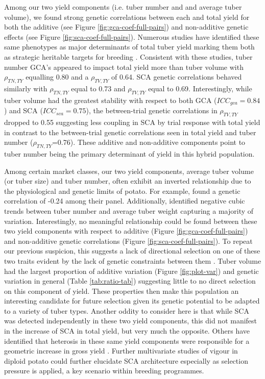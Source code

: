 Among our two yield components (i.e. tuber number and and average tuber volume), we found strong genetic correlations between each and total yield for both the additive (see Figure \ref{fig:gca-coef-full-pairs}) and non-additive genetic effects (see Figure \ref{fig:sca-coef-full-pairs}). Numerous studies have identified these same phenotypes as major determinants of total tuber yield marking them both as strategic heritable targets for breeding \parencite{Khayatnezhad2011, Thompson1984}. Consistent with these studies, tuber number GCA's appeared to impact total yield more than tuber volume with \(\rho_{TN,TY}\) equalling 0.80 and a \(\rho_{TV,TY}\) of 0.64. SCA genetic correlations behaved similarly with \(\rho_{TN,TY}\) equal to 0.73 and \(\rho_{TV,TY}\) equal to 0.69. Interestingly, while tuber volume had the greatest stability with respect to both GCA (\(ICC_{gca}=0.84\)) and SCA (\(ICC_{sca}=0.75\)), the between-trial genetic correlations in \(\rho_{TV,TY}\) dropped to 0.55 suggesting less coupling in SCA by trial response with total yield in contrast to the between-trial genetic correlations seen in total yield and tuber number (\(\rho_{TN,TY}\)=0.76). These additive and non-additive components point to tuber number being the primary determinant of yield in this hybrid population.

Among certain market classes, our two yield components, average tuber volume (or tuber size) and tuber number, often exhibit an inverted relationship due to the physiological and genetic limits of potato. For example, \parencite{Thompson1984} found a genetic correlation of -0.24 among their panel. Additionally, \parencite{Lemaga1990} identified negative cubic trends between tuber number and average tuber weight capturing a majority of variation. Interestingly, no meaningful relationship could be found between these two yield components with respect to additive (Figure \ref{fig:gca-coef-full-pairs}) and non-additive genetic correlations (Figure \ref{fig:sca-coef-full-pairs}). To repeat our previous suspicion, this suggests a lack of directional selection on one of these two traits evident by the lack of genetic constraints between them \parencite{Blows2009}. Tuber volume had the largest proportion of additive variation (Figure \ref{fig:plot-var}) and genetic variation in general (Table \ref{tab:ratio-tab}) suggesting little to no direct selection on this component of yield. These properties then make this population an interesting candidate for future selection given its genetic potential to be adapted to a variety of tuber types. Another oddity to consider here is that while SCA was detected independently in these two yield components, this did not manifest in the increase of SCA in total yield, but very much the opposite. Others have identified that heterosis in these same yield components were responsible for a geometric increase in gross yield \parencite{Tarn1977}. Further multivariate studies of vigour in diploid potato could further elucidate SCA architecture especially as selection pressure is applied, a key scenario within breeding programmes.

